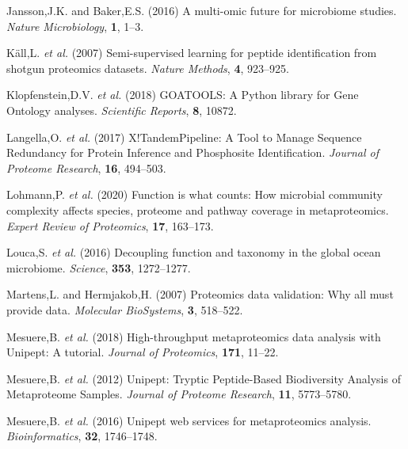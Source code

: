 \begin{CSLReferences}{1}{0}
\leavevmode\hypertarget{ref-janssonMultiomicFutureMicrobiome2016}{}%
Jansson,J.K. and Baker,E.S. (2016) A multi-omic future for microbiome
studies. \emph{Nature Microbiology}, \textbf{1}, 1--3.

\leavevmode\hypertarget{ref-kallSemisupervisedLearningPeptide2007}{}%
Käll,L. \emph{et al.} (2007) Semi-supervised learning for peptide
identification from shotgun proteomics datasets. \emph{Nature Methods},
\textbf{4}, 923--925.

\leavevmode\hypertarget{ref-klopfensteinGOATOOLSPythonLibrary2018}{}%
Klopfenstein,D.V. \emph{et al.} (2018) {GOATOOLS}: {A Python} library
for {Gene Ontology} analyses. \emph{Scientific Reports}, \textbf{8},
10872.

\leavevmode\hypertarget{ref-langellaTandemPipelineToolManage2017}{}%
Langella,O. \emph{et al.} (2017) X!{TandemPipeline}: {A Tool} to {Manage
Sequence Redundancy} for {Protein Inference} and {Phosphosite
Identification}. \emph{Journal of Proteome Research}, \textbf{16},
494--503.

\leavevmode\hypertarget{ref-lohmannFunctionWhatCounts2020}{}%
Lohmann,P. \emph{et al.} (2020) Function is what counts: How microbial
community complexity affects species, proteome and pathway coverage in
metaproteomics. \emph{Expert Review of Proteomics}, \textbf{17},
163--173.

\leavevmode\hypertarget{ref-loucaDecouplingFunctionTaxonomy2016}{}%
Louca,S. \emph{et al.} (2016) Decoupling function and taxonomy in the
global ocean microbiome. \emph{Science}, \textbf{353}, 1272--1277.

\leavevmode\hypertarget{ref-martensProteomicsDataValidation2007}{}%
Martens,L. and Hermjakob,H. (2007) Proteomics data validation: Why all
must provide data. \emph{Molecular BioSystems}, \textbf{3}, 518--522.

\leavevmode\hypertarget{ref-mesuereHighthroughputMetaproteomicsData2018}{}%
Mesuere,B. \emph{et al.} (2018) High-throughput metaproteomics data
analysis with {Unipept}: {A} tutorial. \emph{Journal of Proteomics},
\textbf{171}, 11--22.

\leavevmode\hypertarget{ref-mesuereUnipeptTrypticPeptideBased2012}{}%
Mesuere,B. \emph{et al.} (2012) Unipept: {Tryptic Peptide-Based
Biodiversity Analysis} of {Metaproteome Samples}. \emph{Journal of
Proteome Research}, \textbf{11}, 5773--5780.

\leavevmode\hypertarget{ref-mesuereUnipeptWebServices2016}{}%
Mesuere,B. \emph{et al.} (2016) Unipept web services for metaproteomics
analysis. \emph{Bioinformatics}, \textbf{32}, 1746--1748.


\end{CSLReferences}
